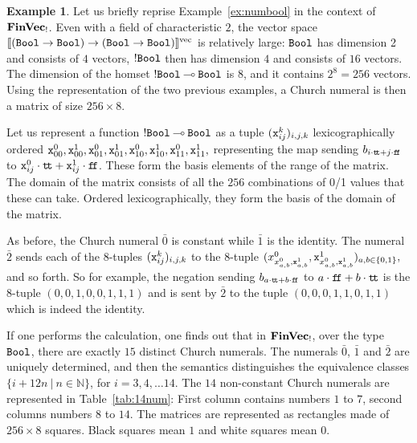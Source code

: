 \documentclass[10pt]{article}
\theoremstyle{plain}
\theoremstyle{definition}
\newtheorem{example}[theorem]{Example}
\newcommand{\bor}{\ |\ }
\newcommand{\loli}{\mathbin{\multimap}}
\newcommand{\FinVec}{\mbox{\bf FinVec}}
\newcommand{\ttrue}{{\tt t}\!{\tt t}}
\newcommand{\ffalse}{{\tt f}\!{\tt f}}
\newcommand{\bit}{{\tt Bool}}
\newcommand{\fvdenot}[1]{{[\![{#1}]\!]^{\rm vec}}}
\begin{document}
\begin{example}
  \label{ex:numbool-alg}
  Let us briefly reprise Example~\ref{ex:numbool} in
  the context of ${\FinVec}_!$. Even with a field of characteristic
  $2$, the vector space $\fvdenot{(\bit\to\bit)\to(\bit\to\bit)}$ is
  relatively
  large: $\bit$ has dimension 2 and consists of $4$ vectors, ${!\bit}$
  then has dimension $4$ and consists of $16$ vectors. The dimension
  of the homset ${!\bit}\loli\bit$ is $8$, and it contains $2^{8}=256$
  vectors. Using the representation of the two previous examples, a
  Church numeral is then a matrix of size $256\times 8$.
  
  Let us represent a function ${!\bit}\loli\bit$ as a tuple $({\tt
    x}^k_{ij})_{i,j,k}$ lexicographically ordered
  $
  {\tt x}^0_{00}, {\tt x}^1_{00}, {\tt x}^0_{01}, {\tt x}^1_{01}, {\tt
    x}^0_{10}, {\tt x}^1_{10}, {\tt x}^0_{11}, {\tt x}^1_{11},
  $
  representing the map sending $b_{i\cdot\ttrue+j\cdot\ffalse}$ to
  ${\tt x}^0_{ij}\cdot\ttrue + {\tt x}^1_{ij}\cdot\ffalse$.
  These form the basis elements of the range of the matrix. The
  domain of the matrix consists of all the $256$ combinations of 0/1
  values that these can take. Ordered lexicographically, they form the
  basis of the domain of the matrix.
  
  As before, the Church numeral $\bar0$ is constant while 
  $\bar{1}$ is the identity. 
  The numeral $\bar{2}$ sends each of the $8$-tuples $({\tt
    x}^k_{ij})_{i,j,k}$ to the $8$-tuple
  $
  (x^0_{x^0_{a,b},{\tt x}^1_{a,b}},{\tt x}^1_{x^0_{a,b},{\tt x}^1_{a,b}})_{a,b\in\{0,1\}},
  $
  and so forth.
So for example, the negation sending $b_{a\cdot\ttrue +
    b\cdot\ffalse}$ to $a\cdot\ffalse + b\cdot\ttrue$ is the $8$-tuple
  $(0,0,1,0,0,1,1,1)$ and is sent by $\bar{2}$ to the tuple
  $(0,0,0,1,1,0,1,1)$ which is indeed the identity.
  
  If one performs the calculation, one finds out that in
  ${\FinVec}_!$, over the type $\bit$, there are exactly $15$ distinct
  Church numerals. The numerals $\bar0$, $\bar1$ and $\bar2$ are
  uniquely determined, and then the semantics distinguishes the
  equivalence classes $\{i+12n\bor n\in\mathbb{N}\}$, for
  $i=3,4,\ldots14$. The $14$ non-constant Church numerals are
  represented in Table~\ref{tab:14num}: First column contains numbers $1$
  to $7$, second columns numbers $8$ to $14$. The matrices are represented
  as rectangles made of $256\times8$ squares. Black squares mean $1$
  and white squares mean $0$.
\end{example}
\end{document}

